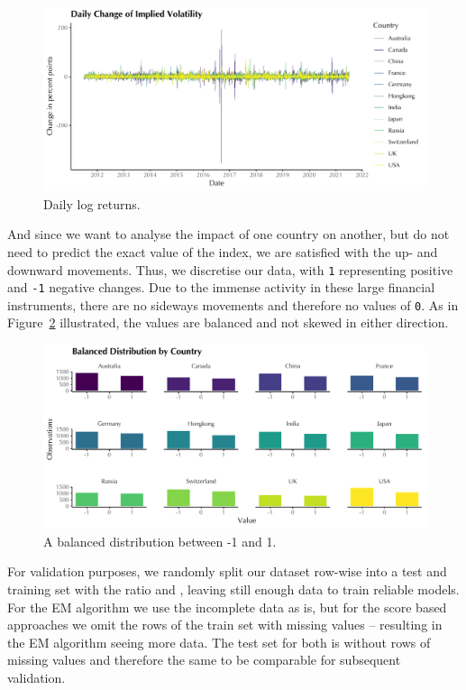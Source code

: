 \documentclass[twoside,twocolumn]{article}
\begin{document}
\begin{figure}[H]
\centering
  \includegraphics[trim={0 0 0 0},clip, width=1.0\linewidth]{../1. Code/Implied Volatility/Exports/Data/Timeseries2}
\caption[Change of daily Implied Volatility]{Daily log returns. }
  \label{fig:timeseriesdaily}
\end{figure}

And since we want to analyse the impact of one country on another, but do not need to predict the exact value of the index, we are satisfied with the up- and downward movements. Thus, we discretise our data, with \texttt{1} representing positive and \texttt{-1}  negative changes. Due to the immense activity in these large financial instruments, there are no sideways movements and therefore no  values of \texttt{0}. As in Figure~\ref{fig:balanced} illustrated, the values are balanced and not skewed in either direction.

\begin{figure}[H]
\centering
  \includegraphics[trim={0 0 0 0},clip, width=1.0\linewidth]{../1. Code/Implied Volatility/Exports/Data/Distribution}
  \caption[Distribution of binary data]{  A balanced distribution between -1 and 1.}
  \label{fig:balanced}
\end{figure}
For validation purposes, we randomly split our dataset row-wise into a test  and  training set with the ratio  and , leaving still enough data to train reliable models. For the EM algorithm we use the incomplete data as is, but for the score based approaches we omit the rows of the train set with missing values -- resulting in the EM algorithm seeing  more data. The test set for both is without rows of missing values and therefore the same to be comparable for subsequent validation. \cite{Kauermann2021} \cite{Hastie2009}
\end{document}
